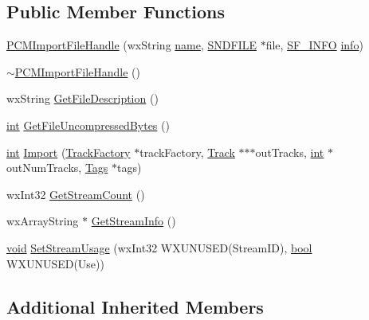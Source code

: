 \subsection*{Public Member Functions}
\begin{DoxyCompactItemize}
\item 
\hyperlink{class_p_c_m_import_file_handle_ab6821eee4597a66e370e96b9af73b4f5}{P\+C\+M\+Import\+File\+Handle} (wx\+String \hyperlink{lib_2expat_8h_a1b49b495b59f9e73205b69ad1a2965b0}{name}, \hyperlink{mac_2config_2i386_2lib-src_2libsndfile_2src_2sndfile_8h_ac14209bc83d532b06a8cdf9ade6d544a}{S\+N\+D\+F\+I\+LE} $\ast$file, \hyperlink{struct_s_f___i_n_f_o}{S\+F\+\_\+\+I\+N\+FO} \hyperlink{lib_2expat_8h_a20806b446e455c50dc5653b7d43e3de2}{info})
\item 
\hyperlink{class_p_c_m_import_file_handle_a3285733966a938e6fca09a56502fe939}{$\sim$\+P\+C\+M\+Import\+File\+Handle} ()
\item 
wx\+String \hyperlink{class_p_c_m_import_file_handle_ab2313166486b003c80e9e200a04cfdfd}{Get\+File\+Description} ()
\item 
\hyperlink{xmltok_8h_a5a0d4a5641ce434f1d23533f2b2e6653}{int} \hyperlink{class_p_c_m_import_file_handle_a9ebe8879b1a8de034d2fb5580fbdc06d}{Get\+File\+Uncompressed\+Bytes} ()
\item 
\hyperlink{xmltok_8h_a5a0d4a5641ce434f1d23533f2b2e6653}{int} \hyperlink{class_p_c_m_import_file_handle_a2c43e4431d3f3ce8abc8a7891973b5f0}{Import} (\hyperlink{class_track_factory}{Track\+Factory} $\ast$track\+Factory, \hyperlink{class_track}{Track} $\ast$$\ast$$\ast$out\+Tracks, \hyperlink{xmltok_8h_a5a0d4a5641ce434f1d23533f2b2e6653}{int} $\ast$out\+Num\+Tracks, \hyperlink{class_tags}{Tags} $\ast$tags)
\item 
wx\+Int32 \hyperlink{class_p_c_m_import_file_handle_acf417e7c22fdc46cac1a6738624edccf}{Get\+Stream\+Count} ()
\item 
wx\+Array\+String $\ast$ \hyperlink{class_p_c_m_import_file_handle_ab1039927054dab67e0a37737a98bbaa8}{Get\+Stream\+Info} ()
\item 
\hyperlink{sound_8c_ae35f5844602719cf66324f4de2a658b3}{void} \hyperlink{class_p_c_m_import_file_handle_abc1c24affd55e2c16ec7e9e7df6be44a}{Set\+Stream\+Usage} (wx\+Int32 W\+X\+U\+N\+U\+S\+ED(Stream\+ID), \hyperlink{mac_2config_2i386_2lib-src_2libsoxr_2soxr-config_8h_abb452686968e48b67397da5f97445f5b}{bool} W\+X\+U\+N\+U\+S\+ED(Use))
\end{DoxyCompactItemize}
\subsection*{Additional Inherited Members}


